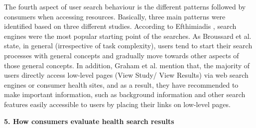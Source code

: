 \documentclass[]{article}
\begin{document}
The fourth aspect of user search behaviour is the different patterns followed by consumers when accessing resources. Basically, three main patterns were identified based on three different studies. According to Efthimiadis \cite{efthimiadis2009students}, search engines were the most popular starting point of the searches. As Broussard et al. \cite{broussard2013seeking} state, in general (irrespective of task complexity), users tend to start their search processes with general concepts and gradually move towards other aspects of those general concepts. In addition, Graham et al. \cite{graham2006exploring} mention that, the majority of users directly access low-level pages (View Study/ View Results) via web search engines or consumer health sites, and as a result, they have recommended to make important information, such as background information and other search features easily accessible to users by placing their links on low-level pages. 

\vspace{0.25cm}

\textbf{5. How consumers evaluate health search results}\\
\end{document}
